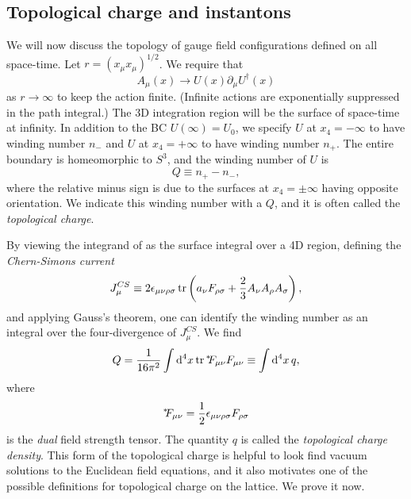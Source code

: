 \subsection{Topological charge and instantons}

We will now discuss the topology of gauge field
configurations defined on all space-time. Let $r=(x_\mu x_\mu)^{1/2}$.
We require that
\begin{equation}
  A_\mu(x)\to U(x)\partial_\mu U^\dagger(x)
\end{equation}
as $r\to\infty$ to keep the action finite. (Infinite actions are
exponentially suppressed in the path integral.) The 3D integration
region will be the surface of space-time at infinity.
In addition to the BC $U(\infty)=U_0$, we specify $U$ at $x_4=-\infty$
to have winding number $n_-$ and $U$ at $x_4=+\infty$ to have
winding number $n_+$. The entire boundary is homeomorphic to
$S^3$, and the winding number of $U$ is
\begin{equation}
  Q\equiv n_+-n_-, 
\end{equation}
where the relative minus sign is due to the surfaces at $x_4=\pm\infty$
having opposite orientation. We indicate this winding number with a
$Q$, and it is often called the {\it topological charge}.

By viewing the integrand of  
as the surface integral over a 4D region, defining the 
{\it Chern-Simons current}
\begin{equation}
  J_\mu^{CS}\equiv 2\epsilon_{\mu\nu\rho\sigma}\tr
    \left(a_\nu F_{\rho\sigma} +\frac{2}{3}A_\nu A_\rho A_\sigma\right),
\end{equation}
and applying Gauss's theorem, one can identify the winding number as 
an integral over the four-divergence of $J_\mu^{CS}$. We find
\begin{equation}\label{eq:Q}
  Q=\frac{1}{16\pi^2}\int\dd[4]{x}\tr\dual{F_{\mu\nu}}F_{\mu\nu}
   \equiv \int\dd[4]{x}q,
\end{equation}
where
\begin{equation} 
{}^{*\hspace{-1mm}}{F}_{\mu\nu}=\frac{1}{2}\epsilon_{\mu\nu\rho\sigma}F_{\rho\sigma}
\end{equation}
is the {\it dual} field strength tensor. The quantity
$q$ is called the {\it topological charge density}. This form of the
topological charge is helpful to look find vacuum solutions to the
Euclidean field equations, and it also motivates one of the possible
definitions for topological charge on the lattice. We prove it now.

